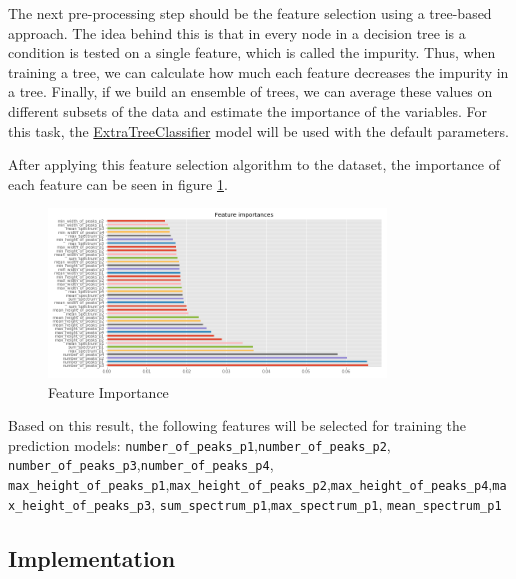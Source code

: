 \documentclass[11pt]{article}
\begin{document}
The next pre-processing step should be the feature selection using a
tree-based approach. The idea behind this is that in every node in a
decision tree is a condition is tested on a single feature, which is
called the impurity. Thus, when training a tree, we can calculate how
much each feature decreases the impurity in a tree. Finally, if we build
an ensemble of trees, we can average these values on different subsets
of the data and estimate the importance of the variables. For this task,
the
\href{https://scikit-learn.org/stable/modules/generated/sklearn.ensemble.ExtraTreesClassifier.html}{ExtraTreeClassifier}
model will be used with the default parameters.

After applying this feature selection algorithm to the dataset, the
importance of each feature can be seen in figure \ref{fig:feat_importance}.

\begin{figure}[h]
\centering
\includegraphics[width=0.8\textwidth]{feature_importances.png}
\caption{Feature Importance}
\label{fig:feat_importance}
\end{figure}

Based on this result, the following features will be selected for
training the prediction models: \texttt{number\_of\_peaks\_p1},\texttt{number\_of\_peaks\_p2}, \texttt{number\_of\_peaks\_p3},\texttt{number\_of\_peaks\_p4}, \texttt{max\_height\_of\_peaks\_p1},\texttt{max\_height\_of\_peaks\_p2},\texttt{max\_height\_of\_peaks\_p4},\texttt{max\_height\_of\_peaks\_p3}, \texttt{sum\_spectrum\_p1},\texttt{max\_spectrum\_p1}, \texttt{mean\_spectrum\_p1}

\hypertarget{implementation}{%
\subsection{Implementation}\label{implementation}}
\end{document}
